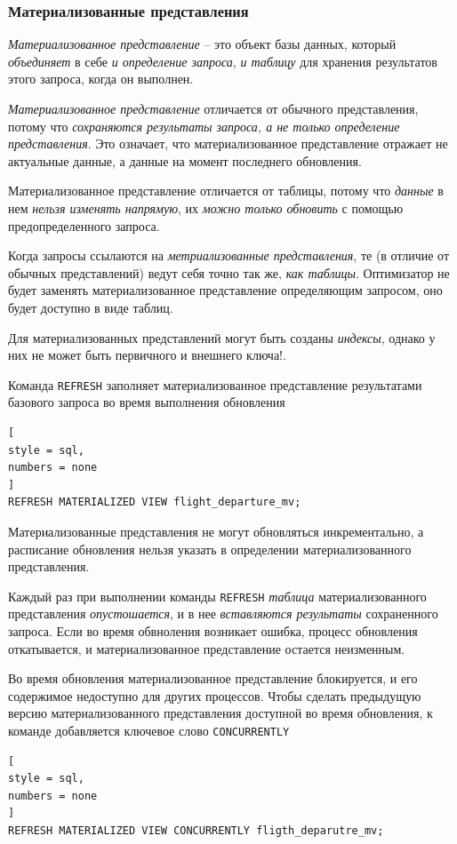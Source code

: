 \documentclass[%
	11pt,
	a4paper,
	utf8,
		]{article}
\begin{document}
\subsubsection{Материализованные представления}

\emph{Материализованное представление} -- это объект базы данных, который \emph{объединяет} в себе \emph{и определение запроса}, \emph{и таблицу} для хранения результатов этого запроса, когда он выполнен.

\emph{\color{blue}Материализованное представление} отличается от обычного представления, потому что \emph{\color{blue}сохраняются результаты запроса, а не только определение представления}. Это означает, что материализованное представление отражает не актуальные данные, а данные на момент последнего обновления.

Материализованное представление отличается от таблицы, потому что \emph{данные} в нем \emph{нельзя изменять напрямую}, их \emph{можно только обновить} с помощью предопределенного запроса.

Когда запросы ссылаются на \emph{метриализованные представления}, те (в отличие от обычных представлений) ведут себя точно так же, \emph{как таблицы}. Оптимизатор не будет заменять материализованное представление определяющим запросом, оно будет доступно в виде таблиц.

Для материализованных представлений могут быть созданы \emph{индексы}, однако у них {\color{red}не может быть первичного и внешнего ключа!}.

Команда \verb|REFRESH| заполняет материализованное представление результатами базового запроса во время выполнения обновления
\begin{lstlisting}[
style = sql,
numbers = none	
]
REFRESH MATERIALIZED VIEW flight_departure_mv;
\end{lstlisting}

Материализованные представления не могут обновляться инкрементально, а расписание обновления нельзя указать в определении материализованного представления.

Каждый раз при выполнении команды \verb|REFRESH| \emph{таблица} материализованного представления \emph{опустошается}, и в нее \emph{вставляются результаты} сохраненного запроса. Если во время обвноления возникает ошибка, процесс обновления откатывается, и материализованное представление остается неизменным.

Во время обновления материализованное представление блокируется, и его содержимое недоступно для других процессов. Чтобы сделать предыдущую версию материализованного представления доступной во время обновления, к команде добавляется ключевое слово \verb|CONCURRENTLY|
\begin{lstlisting}[
style = sql,
numbers = none
]
REFRESH MATERIALIZED VIEW CONCURRENTLY fligth_deparutre_mv;
\end{lstlisting}
\end{document}
